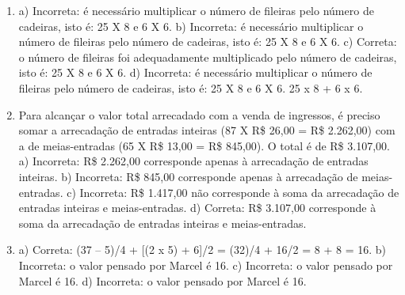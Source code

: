 
\begin{enumerate}
\item
a) Incorreta: é necessário multiplicar o número de fileiras
pelo número de cadeiras, isto é: 25 X 8 e 6 X 6. 
b) Incorreta: é necessário multiplicar o número de fileiras
pelo número de cadeiras, isto é: 25 X 8 e 6 X 6.  
c) Correta: o número de fileiras foi adequadamente multiplicado 
pelo número de cadeiras, isto é: 25 X 8 e 6 X 6. 
d) Incorreta: é necessário multiplicar o número de fileiras
pelo número de cadeiras, isto é: 25 X 8 e 6 X 6.  
25 x 8 + 6 x 6.

\item
Para alcançar o valor total arrecadado com a 
venda de ingressos, é preciso somar a arrecadação de entradas inteiras
(87 X R\$ 26,00 = R\$ 2.262,00) com a de meias-entradas 
(65 X R\$ 13,00 = R\$ 845,00). O total é de R\$ 3.107,00. 
a) Incorreta: R\$ 2.262,00 corresponde apenas à arrecadação de entradas 
inteiras.  
b) Incorreta: R\$ 845,00 corresponde apenas à arrecadação de 
meias-entradas. 
c) Incorreta: R\$ 1.417,00 não corresponde à soma da arrecadação de 
entradas inteiras e meias-entradas.
d) Correta: R\$ 3.107,00 corresponde à soma da arrecadação de 
entradas inteiras e meias-entradas.

\item
a) Correta: (37 -- 5)/4 + [(2 x 5) + 6]/2 = (32)/4 + 16/2 = 8 + 8 = 16.
b) Incorreta: o valor pensado por Marcel é 16.
c) Incorreta: o valor pensado por Marcel é 16.
d) Incorreta: o valor pensado por Marcel é 16.
\end{enumerate}


